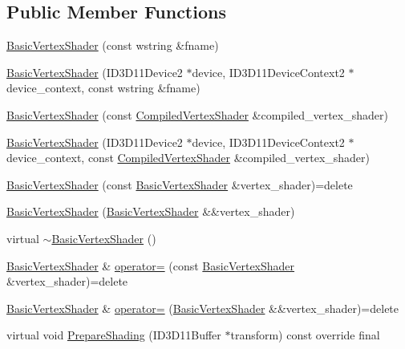 \subsection*{Public Member Functions}
\begin{DoxyCompactItemize}
\item 
\hyperlink{classmage_1_1_basic_vertex_shader_ab00129cc3b679e531480153ece6a2456}{Basic\+Vertex\+Shader} (const wstring \&fname)
\item 
\hyperlink{classmage_1_1_basic_vertex_shader_a906db88dc79cfc9c3f0898d14f54065d}{Basic\+Vertex\+Shader} (I\+D3\+D11\+Device2 $\ast$device, I\+D3\+D11\+Device\+Context2 $\ast$device\+\_\+context, const wstring \&fname)
\item 
\hyperlink{classmage_1_1_basic_vertex_shader_a982ef446aaec98e6c328dc8bcc308137}{Basic\+Vertex\+Shader} (const \hyperlink{structmage_1_1_compiled_vertex_shader}{Compiled\+Vertex\+Shader} \&compiled\+\_\+vertex\+\_\+shader)
\item 
\hyperlink{classmage_1_1_basic_vertex_shader_a9cd9b21663a009c1ca37c35ab6ac7298}{Basic\+Vertex\+Shader} (I\+D3\+D11\+Device2 $\ast$device, I\+D3\+D11\+Device\+Context2 $\ast$device\+\_\+context, const \hyperlink{structmage_1_1_compiled_vertex_shader}{Compiled\+Vertex\+Shader} \&compiled\+\_\+vertex\+\_\+shader)
\item 
\hyperlink{classmage_1_1_basic_vertex_shader_ab547bf423545c41882a691ff3ebb32ce}{Basic\+Vertex\+Shader} (const \hyperlink{classmage_1_1_basic_vertex_shader}{Basic\+Vertex\+Shader} \&vertex\+\_\+shader)=delete
\item 
\hyperlink{classmage_1_1_basic_vertex_shader_a1c5f899e5dfaf81609e8e8fd73103ab2}{Basic\+Vertex\+Shader} (\hyperlink{classmage_1_1_basic_vertex_shader}{Basic\+Vertex\+Shader} \&\&vertex\+\_\+shader)
\item 
virtual \hyperlink{classmage_1_1_basic_vertex_shader_ad155c4135f5517667020ec519a3597c9}{$\sim$\+Basic\+Vertex\+Shader} ()
\item 
\hyperlink{classmage_1_1_basic_vertex_shader}{Basic\+Vertex\+Shader} \& \hyperlink{classmage_1_1_basic_vertex_shader_ab3d355e76715b24e21fb37c239d41932}{operator=} (const \hyperlink{classmage_1_1_basic_vertex_shader}{Basic\+Vertex\+Shader} \&vertex\+\_\+shader)=delete
\item 
\hyperlink{classmage_1_1_basic_vertex_shader}{Basic\+Vertex\+Shader} \& \hyperlink{classmage_1_1_basic_vertex_shader_ae5442c36b5f913ac6644cc2945a8c20a}{operator=} (\hyperlink{classmage_1_1_basic_vertex_shader}{Basic\+Vertex\+Shader} \&\&vertex\+\_\+shader)=delete
\item 
virtual void \hyperlink{classmage_1_1_basic_vertex_shader_ae565cb19b96591d5d1ff36ac0ff7344c}{Prepare\+Shading} (I\+D3\+D11\+Buffer $\ast$transform) const override final
\end{DoxyCompactItemize}
